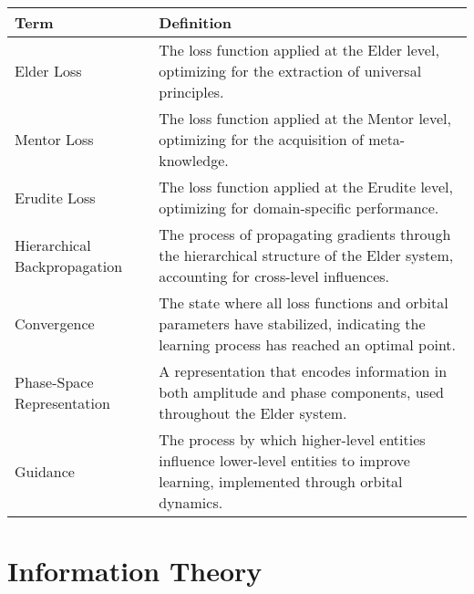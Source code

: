 \begin{center}
\begin{tabular}{|l|p{12cm}|}
\hline
\textbf{Term} & \textbf{Definition} \\
\hline
Elder Loss & The loss function applied at the Elder level, optimizing for the extraction of universal principles. \\
\hline
Mentor Loss & The loss function applied at the Mentor level, optimizing for the acquisition of meta-knowledge. \\
\hline
Erudite Loss & The loss function applied at the Erudite level, optimizing for domain-specific performance. \\
\hline
Hierarchical Backpropagation & The process of propagating gradients through the hierarchical structure of the Elder system, accounting for cross-level influences. \\
\hline
Convergence & The state where all loss functions and orbital parameters have stabilized, indicating the learning process has reached an optimal point. \\
\hline
Phase-Space Representation & A representation that encodes information in both amplitude and phase components, used throughout the Elder system. \\
\hline
Guidance & The process by which higher-level entities influence lower-level entities to improve learning, implemented through orbital dynamics. \\
\hline
\end{tabular}
\label{tab:learning_terminology}
\end{center}

\section{Information Theory}

